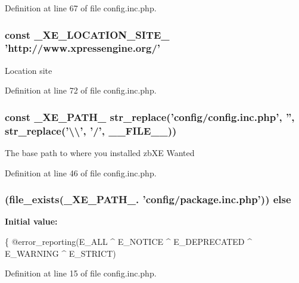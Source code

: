 Definition at line 67 of file config.\+inc.\+php.

\hypertarget{config_8inc_8php_a063bfd2eb9f811b1676d0dbc0cad2648}{
\subsubsection[{\+\_\+\+X\+E\+\_\+\+L\+O\+C\+A\+T\+I\+O\+N\+\_\+\+S\+I\+T\+E\+\_\+}]{\setlength{\rightskip}{0pt plus 5cm}const \+\_\+\+X\+E\+\_\+\+L\+O\+C\+A\+T\+I\+O\+N\+\_\+\+S\+I\+T\+E\+\_\+ 'http\+://www.\+xpressengine.\+org/'}}\label{config_8inc_8php_a063bfd2eb9f811b1676d0dbc0cad2648}
Location site 

Definition at line 72 of file config.\+inc.\+php.

\hypertarget{config_8inc_8php_a5387c7a3f2aa38adf16f324cee88db88}{
\subsubsection[{\+\_\+\+X\+E\+\_\+\+P\+A\+T\+H\+\_\+}]{\setlength{\rightskip}{0pt plus 5cm}const \+\_\+\+X\+E\+\_\+\+P\+A\+T\+H\+\_\+ str\+\_\+replace('config/config.\+inc.\+php', '', str\+\_\+replace('\textbackslash{}\textbackslash{}', '/', \+\_\+\+\_\+\+F\+I\+L\+E\+\_\+\+\_\+))}}\label{config_8inc_8php_a5387c7a3f2aa38adf16f324cee88db88}
The base path to where you installed zb\+X\+E Wanted 

Definition at line 46 of file config.\+inc.\+php.

\hypertarget{config_8inc_8php_a249caa62ba3f93fa3cb8d963d5634fe1}{
\subsubsection[{else}]{ (file\+\_\+exists(\+\_\+\+X\+E\+\_\+\+P\+A\+T\+H\+\_\+. 'config/package.\+inc.\+php')) else}}\label{config_8inc_8php_a249caa62ba3f93fa3cb8d963d5634fe1}
{\bfseries Initial value\+:}
\begin{DoxyCode}
\{
    @error\_reporting(E\_ALL ^ E\_NOTICE ^ E\_DEPRECATED ^ E\_WARNING ^ E\_STRICT)
\end{DoxyCode}


Definition at line 15 of file config.\+inc.\+php.

